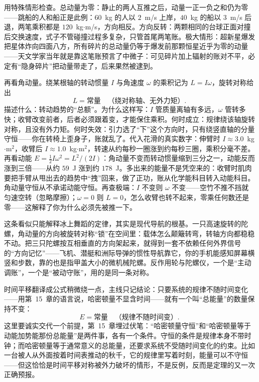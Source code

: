 用特殊情形检查。总动量为零：静止的两人互推之后，动量一正一负之和仍为零——跳船的人和船正是此例：\(60\)~kg 的人以 \(2\)~m/s 上岸，\(40\)~kg 的船以 \(3\)~m/s 后退，两笔乘积都是 \(120\)~kg\(\cdot\)m/s，方向相反。方向反转：两颗相同的台球正面对撞后交换速度，式子不管碰撞过程多复杂，只管首尾两笔账。极大情形：超新星爆发把星体炸向四面八方，所有碎片的总动量仍等于爆发前那颗恒星近乎为零的动量——天文学家当年就是靠这笔账预言了中微子：可见碎片加上辐射的账对不平，必定有“隐身碎片”把动量带走了，后来果然被逮到。

再看角动量。绕某根轴的转动惯量 \(I\) 与角速度 \(\omega\) 的乘积记为 \(L=I\omega\)，旋转对称给出
\[
L=\text{常量}\quad\text{（绕对称轴、无外力矩）}.
\]
描述什么：转动趋势的“总额”。为什么这样写：\(I\) 管质量离轴有多远，\(\omega\) 管转多快；收臂改变前者，后者必须跟着变，才能保住乘积。何时成立：规律绕该轴旋转对称，且没有外力矩。何时失效：引力选了“下”这个方向时，只有绕竖直轴的分量守恒——你在转椅上歪身子，账就乱了。代入花滑的真实数字：伸臂时 \(I\approx3.0\)~kg\(\cdot\)m\(^2\)，收臂后 \(I\approx1.0\)~kg\(\cdot\)m\(^2\)，转速从约每秒一圈涨到约每秒三圈，乘积分毫不差。再看动能 \(E=\tfrac12 I\omega^2=L^2/(2I)\)：角动量不变而转动惯量缩到三分之一，动能反而涨到三倍——从约 \(59\)~J 涨到约 \(178\)~J。多出来的能量不是凭空来的：收臂时肌肉要把手臂从甩出去的趋势中“拽”回来，做了正功，账从化学能科目转入动能科目。角动量守恒从不承诺动能守恒。再查极端：\(I\) 不变则 \(\omega\) 不变——空竹不推不挡就匀速空转（忽略摩擦）；\(\omega=0\) 则 \(L=0\)，怎么收臂也转不起来，零乘任何数还是零——这解释了你为什么必须先被推一下。

这条看似只能解释冰上舞蹈的定律，其实是现代导航的根基。一只高速旋转的陀螺，角动量的方向被旋转对称“锁”在空间里：载体怎么颠簸转弯，转轴方向都稳稳不动。把三只陀螺按互相垂直的方向架起来，就得到一套不依赖任何外界信号的“方向记忆”——飞机、潜艇和洲际导弹的惯性导航靠它，你的手机能感知屏幕横竖和步数，靠的也是指甲盖大小的微机械陀螺。反作用轮与陀螺仪，一个是“主动调账”，一个是“被动守账”，用的是同一条对称。

时间平移翻译成公式稍微绕一点，主线只记结论：只要系统的规律不随时间变化——用第~15~章的语言说，哈密顿量不显含时间——就有一个叫“总能量”的数量保持不变：
\[
E=\text{常量}\quad\text{（规律不随时间变）}.
\]
这里要诚实交代一个前提，第~15~章埋过伏笔：“哈密顿量守恒”和“哈密顿量等于动能加势能那份总能量”是两件事，各有一个条件。守恒的条件是规律本身不带时钟；而哈密顿量等于通常意义的总能量，还要求系统不受随时间变化的约束。比如一台被人从外面按着时间表推动的秋千，它的规律里写着时刻，能量可以不守恒——但这恰恰是时间平移对称被外力破坏的情形，不是反例，反而是定理的又一次正确预报。

